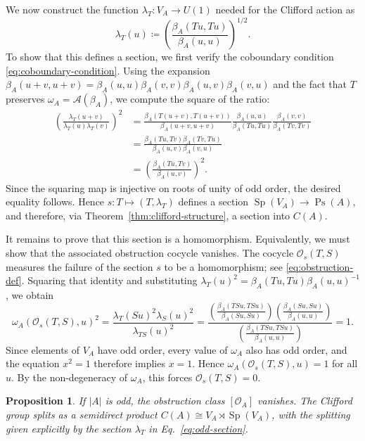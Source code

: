 \documentclass[11pt, reqno]{amsart}
\newtheorem{proposition}[theorem]{Proposition}
\theoremstyle{definition}
\theoremstyle{remark}
\newcommand{\cO}{\mathcal{O}}
\DeclareMathOperator{\Sp}{Sp}
\DeclareMathOperator{\Ps}{Ps}
\begin{document}
We now construct the function $\lambda_T: V_A \to U(1)$ needed for the Clifford action as
\begin{equation}\label{eq:odd-section}
\lambda_T(u) \coloneqq \left( \frac{\beta_A(Tu, Tu)}{\beta_A(u, u)} \right)^{1/2}.
\end{equation}
To show that this defines a section, we first verify the coboundary condition \eqref{eq:coboundary-condition}. Using the expansion $\beta_A(u+v, u+v) = \beta_A(u, u)\beta_A(v, v)\beta_A(u, v)\beta_A(v, u)$ and the fact that $T$ preserves $\omega_A=\mathcal A(\beta_A)$, we compute the square of the ratio:
\begin{align}
\left( \frac{\lambda_T(u+v)}{\lambda_T(u)\lambda_T(v)} \right)^2 &= \frac{\beta_A(T(u+v), T(u+v))}{\beta_A(u+v, u+v)} \frac{\beta_A(u, u)}{\beta_A(Tu, Tu)} \frac{\beta_A(v, v)}{\beta_A(Tv, Tv)} \nonumber \\
&= \frac{\beta_A(Tu, Tv)\beta_A(Tv, Tu)}{\beta_A(u, v)\beta_A(v, u)} \nonumber \\
&= \left( \frac{\beta_A(Tu, Tv)}{\beta_A(u, v)} \right)^2.
\end{align}
Since the squaring map is injective on roots of unity of odd order, the desired equality follows. Hence $s:T\mapsto (T,\lambda_T)$ defines a section $\Sp(V_A)\to \Ps(A)$, and therefore, via Theorem~\ref{thm:clifford-structure}, a section into $C(A)$.

It remains to prove that this section is a homomorphism. Equivalently, we must show that the associated obstruction cocycle vanishes. The cocycle $\cO_s(T, S)$ measures the failure of the section $s$ to be a homomorphism; see \eqref{eq:obstruction-def}. Squaring that identity and substituting $\lambda_T(u)^2 = \beta_A(Tu, Tu)\beta_A(u, u)^{-1}$, we obtain
\begin{equation}
\omega_A(\cO_s(T, S), u)^2 = \frac{\lambda_T(Su)^2 \lambda_S(u)^2}{\lambda_{TS}(u)^2}
= \frac{\left(\frac{\beta_A(TSu, TSu)}{\beta_A(Su, Su)}\right) \left(\frac{\beta_A(Su, Su)}{\beta_A(u, u)}\right)}{\left(\frac{\beta_A(TSu, TSu)}{\beta_A(u, u)}\right)} = 1.
\end{equation}
Since elements of $V_A$ have odd order, every value of $\omega_A$ also has odd order, and the equation $x^2 = 1$ therefore implies $x = 1$. Hence $\omega_A(\cO_s(T, S), u) = 1$ for all $u$. By the non-degeneracy of $\omega_A$, this forces $\cO_s(T, S) = 0$.

\begin{proposition}\label{prop:odd_case_vanish}
If $|A|$ is odd, the obstruction class $[\cO_A]$ vanishes. The Clifford group splits as a semidirect product $C(A) \cong V_A \rtimes \Sp(V_A)$, with the splitting given explicitly by the section $\lambda_T$ in Eq.~\eqref{eq:odd-section}.
\end{proposition}
\end{document}
